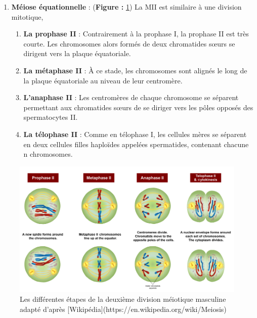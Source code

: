 \documentclass[12pt,twoside]{reedthesis}
\providecommand{\tightlist}{%
  \setlength{\itemsep}{0pt}\setlength{\parskip}{0pt}}
\theoremstyle{definition}
\theoremstyle{definition}
\theoremstyle{remark}
\begin{document}
  \begin{enumerate}
  \def\labelenumi{\arabic{enumi}.}
  \setcounter{enumi}{1}
  \tightlist
  \item
    \textbf{Méiose équationnelle} : (\textbf{Figure : }\ref{fig:meioseii})
    La MII est similaire à une division mitotique,
  
    \begin{enumerate}
    \def\labelenumii{\alph{enumii}.}
    \tightlist
    \item
      \textbf{La prophase II} : Contrairement à la prophase I, la prophase
      II est très courte. Les chromosomes alors formés de deux chromatides
      sœurs se dirigent vers la plaque équatoriale.\\
    \item
      \textbf{La métaphase II} : À ce stade, les chromosomes sont alignés
      le long de la plaque équatoriale au niveau de leur centromère.\\
    \item
      \textbf{L'anaphase II} : Les centromères de chaque chromosome se
      séparent permettant aux chromatides sœurs de se diriger vers les
      pôles opposés des spermatocytes II.\\
    \item
      \textbf{La télophase II} : Comme en télophase I, les cellules mères
      se séparent en deux cellules filles haploïdes appelées spermatides,
      contenant chacune n chromosomes.
    \end{enumerate}
  \end{enumerate}
  
  \begin{figure}
  
  {\centering \includegraphics[scale=0.43]{figure/MeiosisII} 
  
  }
  
  \caption[Les différentes étapes de la deuxième division méiotique masculine adapté]{Les différentes étapes de la deuxième division méiotique masculine adapté d'après [Wikipédia](https://en.wikipedia.org/wiki/Meiosis)}\label{fig:meioseii}
  \end{figure}
  
\end{document}
